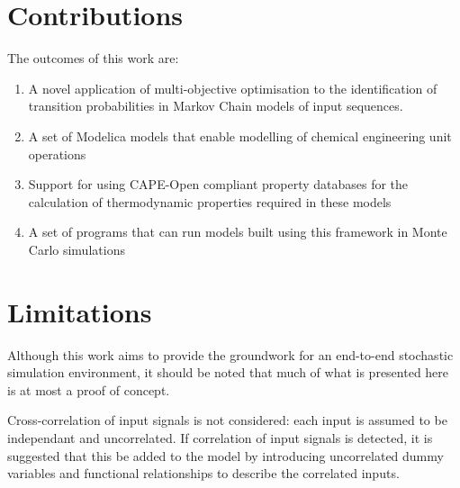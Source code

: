 
\section{Contributions}
The outcomes of this work are:
\begin{enumerate}
\item A novel application of multi-objective optimisation to the identification of transition probabilities in Markov Chain models of input sequences.
\item A set of Modelica models that enable modelling of chemical engineering unit operations
\item Support for using CAPE-Open compliant property databases for the calculation of thermodynamic properties required in these models
\item A set of programs that can run models built using this framework in Monte Carlo simulations
\end{enumerate}

\section{Limitations}
Although this work aims to provide the groundwork for an end-to-end stochastic simulation environment, it should be noted that much of what is presented here is at most a proof of concept.

Cross-correlation of input signals is not considered: each input is assumed to be independant and uncorrelated.
If correlation of input signals is detected, it is suggested that this be added to the model by introducing uncorrelated dummy variables and functional relationships to describe the correlated inputs.

